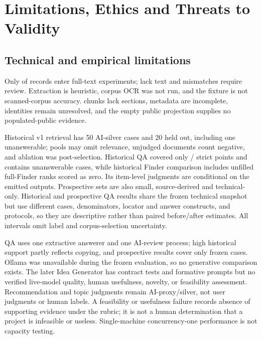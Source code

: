 \chapter{Limitations, Ethics and Threats to Validity}
\label{ch:limitations}

\section{Technical and empirical limitations}

Only \EligiblePaperCount{} of \CatalogPaperCount{} records enter full-text experiments; \NoTextPaperCount{} lack text and \MismatchPaperCount{} mismatches require review. Extraction is heuristic, corpus OCR was not run, and the fixture is not scanned-corpus accuracy. \EligibleUnknownChunkCount{} chunks lack sections, metadata are incomplete, \PossibleAuthorMergeCount{} identities remain unresolved, and the empty public projection supplies no populated-public evidence.

Historical v1 retrieval has 50 AI-silver cases and 20 held out, including one unanswerable; pools may omit relevance, unjudged documents count negative, and ablation was post-selection. Historical QA covered only \QaCoveredAnswerPointCount{}/\QaAnswerPointCount{} strict points and contains \QaUnanswerableCaseCount{} unanswerable cases, while historical Finder comparison includes \RecommendationFullMissingCount{} unfilled full-Finder ranks scored as zero. Its item-level judgments are conditional on the \RecommendationFullReturnedCount{} emitted outputs. Prospective sets are also small, source-derived and technical-only. Historical and prospective QA results share the frozen technical snapshot but use different cases, denominators, locator and answer constructs, and protocols, so they are descriptive rather than paired before/after estimates. All intervals omit label and corpus-selection uncertainty.

QA uses one extractive answerer and one AI-review process; high historical support partly reflects copying, and prospective results cover only frozen cases. Ollama was unavailable during the frozen evaluation, so no generative comparison exists. The later Idea Generator has contract tests and formative prompts but no verified live-model quality, human usefulness, novelty, or feasibility assessment. Recommendation and topic judgments remain AI-proxy/silver, not user judgments or human labels. A feasibility or usefulness failure records absence of supporting evidence under the rubric; it is not a human determination that a project is infeasible or useless. Single-machine concurrency-one performance is not capacity testing.

